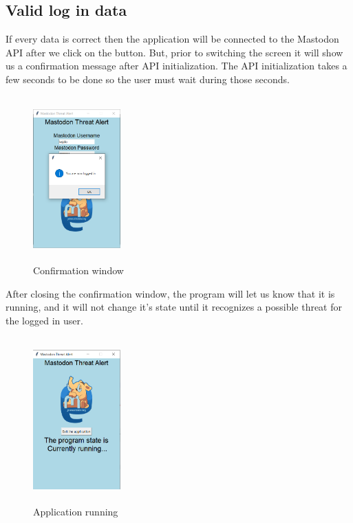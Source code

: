 \subsection{Valid log in data}
\label{ss:correct_data}
If every data is correct then the application will be connected to the Mastodon API after
we click on the button. But, prior to switching the screen it will show us a confirmation
message after API initialization. The API initialization takes a few seconds to be done so the user must wait during those seconds.
\begin{figure}[H]
	\centering
	\includegraphics[width=0.3\textwidth,height=240px]{images/confimlogin.png}
	\caption{Confirmation window}
	\label{fig:confirm_logn}
\end{figure}
After closing the confirmation window, 
the program will let us know that it is running, and it will not
change it's state until it recognizes a possible threat for the logged in user.
\begin{figure}[H]
	\centering
	\includegraphics[width=0.3\textwidth,height=240px]{images/runningapp.png}
	\caption{Application running}
	\label{fig:running_app}
\end{figure}

